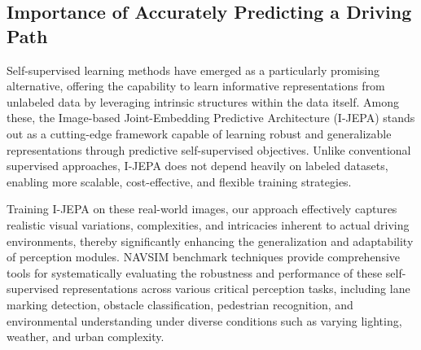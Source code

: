 \documentclass{article}
\begin{document}

\label{sec:related}

\subsection{Importance of Accurately Predicting a Driving Path}
\label{sec:Importance}

Self-supervised learning methods have emerged as a particularly promising alternative, offering the capability to learn informative representations from unlabeled data by leveraging intrinsic structures within the data itself. Among these, the Image-based Joint-Embedding Predictive Architecture (I-JEPA) stands out as a cutting-edge framework capable of learning robust and generalizable representations through predictive self-supervised objectives. Unlike conventional supervised approaches, I-JEPA does not depend heavily on labeled datasets, enabling more scalable, cost-effective, and flexible training strategies.

Training I-JEPA on these real-world images, our approach effectively captures realistic visual variations, complexities, and intricacies inherent to actual driving environments, thereby significantly enhancing the generalization and adaptability of perception modules. NAVSIM benchmark techniques provide comprehensive tools for systematically evaluating the robustness and performance of these self-supervised representations across various critical perception tasks, including lane marking detection, obstacle classification, pedestrian recognition, and environmental understanding under diverse conditions such as varying lighting, weather, and urban complexity.
\end{document}
